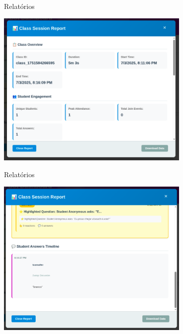 \documentclass[aspectratio=169]{beamer}
\begin{document}
{\begin{frame}{Relatórios}
  \begin{center}
    \includegraphics[width=0.7\textwidth]{func-professores/4.png}
  \end{center}
\end{frame}

\begin{frame}{Relatórios}
  \begin{center}
    \includegraphics[width=0.7\textwidth]{func-professores/5.png}
  \end{center}
\end{frame}

}
\end{document}
